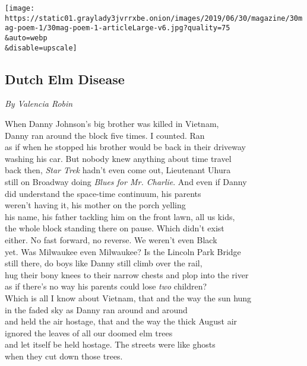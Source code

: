 \texttt{[image: https://static01.graylady3jvrrxbe.onion/images/2019/06/30/magazine/30mag-poem-1/30mag-poem-1-articleLarge-v6.jpg?quality=75\\\&auto=webp\\\&disable=upscale]}

\hypertarget{dutch-elm-disease}{%
\subsection{Dutch Elm Disease}\label{dutch-elm-disease}}

\emph{By Valencia Robin}

When Danny Johnson's big brother was killed in Vietnam,\\
Danny ran around the block five times. I counted. Ran\\
as if when he stopped his brother would be back in their driveway\\
washing his car. But nobody knew anything about time travel\\
back then, \emph{Star Trek} hadn't even come out, Lieutenant Uhura\\
still on Broadway doing \emph{Blues for Mr. Charlie}. And even if
Danny\\
did understand the space-time continuum, his parents\\
weren't having it, his mother on the porch yelling\\
his name, his father tackling him on the front lawn, all us kids,\\
the whole block standing there on pause. Which didn't exist\\
either. No fast forward, no reverse. We weren't even Black\\
yet. Was Milwaukee even Milwaukee? Is the Lincoln Park Bridge\\
still there, do boys like Danny still climb over the rail,\\
hug their bony knees to their narrow chests and plop into the river\\
as if there's no way his parents could lose \emph{two} children?\\
Which is all I know about Vietnam, that and the way the sun hung\\
in the faded sky as Danny ran around and around\\
and held the air hostage, that and the way the thick August air\\
ignored the leaves of all our doomed elm trees\\
and let itself be held hostage. The streets were like ghosts\\
when they cut down those trees.

